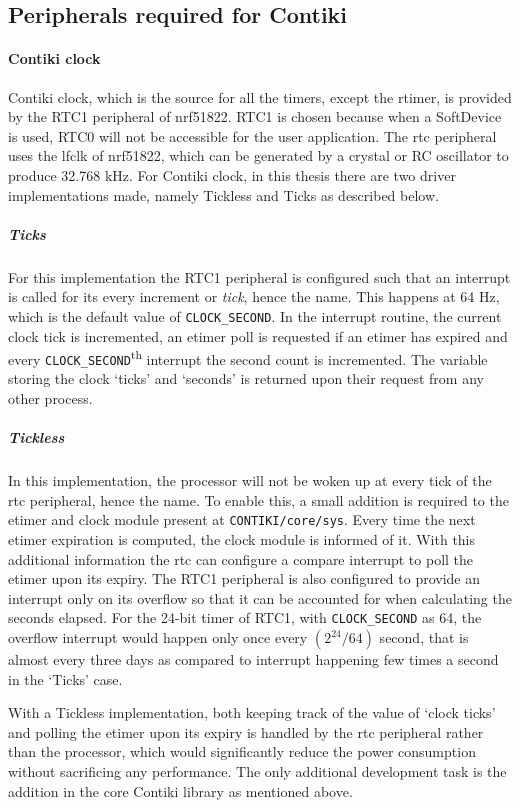 \subsection{Peripherals required for Contiki}\label{peripheralsContiki}
\paragraph{Contiki clock}
Contiki clock, which is the source for all the timers, except the rtimer, is provided by the RTC1 peripheral of nrf51822. RTC1 is chosen because when a SoftDevice is used, RTC0 will not be accessible for the user application. The \gls{rtc} peripheral uses the \gls{lfclk} of nrf51822, which can be generated by a crystal or RC oscillator to produce 32.768 kHz. For Contiki clock, in this thesis there are two driver implementations made, namely Tickless and Ticks as described below.

\subparagraph{Ticks}
For this implementation the RTC1 peripheral is configured such that an interrupt is called for its every increment or \emph{tick}, hence the name. This happens at 64 Hz, which is the default value of \texttt{CLOCK\_SECOND}. In the interrupt routine, the current clock tick is incremented, an etimer poll is requested if an etimer has expired and every \texttt{CLOCK\_SECOND}\textsuperscript{th} interrupt the second count is incremented. The variable storing the clock `ticks' and `seconds' is returned upon their request from any other process.

\subparagraph{Tickless}
In this implementation, the processor will not be woken up at every tick of the \gls{rtc} peripheral, hence the name. To enable this, a small addition is required to the etimer and clock module present at \texttt{CONTIKI/core/sys}. Every time the next etimer expiration is computed, the clock module is informed of it. With this additional information the \gls{rtc} can configure a compare interrupt to poll the etimer upon its expiry. The RTC1 peripheral is also configured to provide an interrupt only on its overflow so that it can be accounted for when calculating the seconds elapsed. For the 24-bit timer of RTC1, with \texttt{CLOCK\_SECOND} as 64, the overflow interrupt would happen only once every $(2^{24}/64)$ second, that is almost every three days as compared to interrupt happening few times a second in the `Ticks' case. 

With a Tickless implementation, both keeping track of the value of `clock ticks' and polling the etimer upon its expiry is handled by the \gls{rtc} peripheral rather than the processor, which would significantly reduce the power consumption without sacrificing any performance. The only additional development task is the addition in the core Contiki library as mentioned above.

